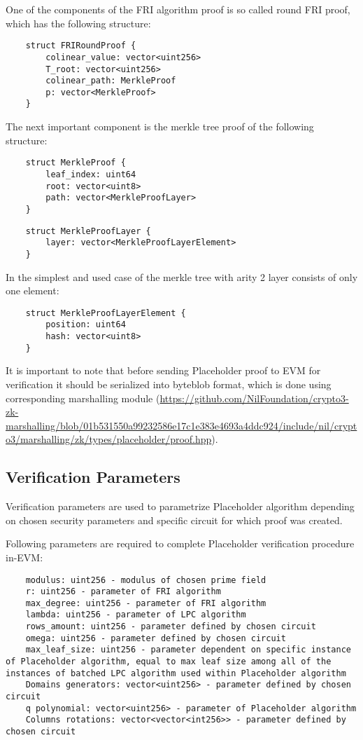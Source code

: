 One of the components of the FRI algorithm proof is so called round FRI proof, which has the following structure:

\begin{verbatim}
    struct FRIRoundProof {
        colinear_value: vector<uint256>
        T_root: vector<uint256>
        colinear_path: MerkleProof
        p: vector<MerkleProof>
    }
\end{verbatim}

The next important component is the merkle tree proof of the following structure:

\begin{verbatim}
    struct MerkleProof {
        leaf_index: uint64
        root: vector<uint8>
        path: vector<MerkleProofLayer>
    }
\end{verbatim}

\begin{verbatim}
    struct MerkleProofLayer {
        layer: vector<MerkleProofLayerElement>
    }       
\end{verbatim}

In the simplest and used case of the merkle tree with arity 2 layer consists of only one element:

\begin{verbatim}
    struct MerkleProofLayerElement {
        position: uint64
        hash: vector<uint8>
    }
\end{verbatim}

It is important to note that before sending Placeholder proof to EVM for verification it should be serialized into byteblob format,
which is done using corresponding marshalling module 
(\url{https://github.com/NilFoundation/crypto3-zk-marshalling/blob/01b531550a99232586e17c1e383e4693a4ddc924/include/nil/crypto3/marshalling/zk/types/placeholder/proof.hpp}).

\subsection{Verification Parameters}

Verification parameters are used to parametrize Placeholder algorithm depending on chosen security parameters and specific circuit for which proof was created.

Following parameters are required to complete Placeholder verification procedure in-EVM:

\begin{verbatim}
    modulus: uint256 - modulus of chosen prime field
    r: uint256 - parameter of FRI algorithm
    max_degree: uint256 - parameter of FRI algorithm
    lambda: uint256 - parameter of LPC algorithm
    rows_amount: uint256 - parameter defined by chosen circuit
    omega: uint256 - parameter defined by chosen circuit
    max_leaf_size: uint256 - parameter dependent on specific instance of Placeholder algorithm, equal to max leaf size among all of the instances of batched LPC algorithm used within Placeholder algorithm
    Domains generators: vector<uint256> - parameter defined by chosen circuit 
    q polynomial: vector<uint256> - parameter of Placeholder algorithm
    Columns rotations: vector<vector<int256>> - parameter defined by chosen circuit
\end{verbatim}
